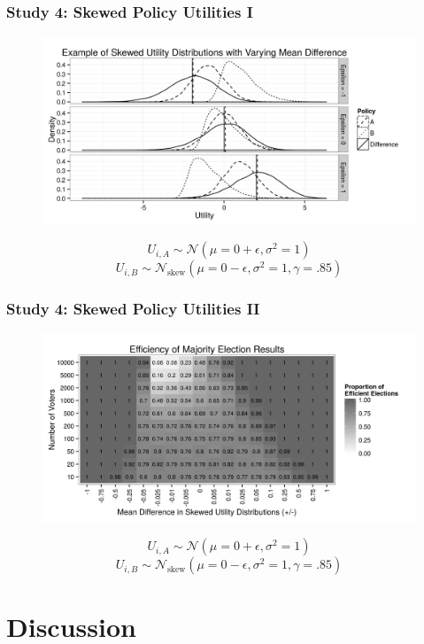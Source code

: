 \documentclass{beamer}
\begin{document}
\subsection{}
\begin{frame}%
  \frametitle{Study 4: Skewed Policy Utilities I}
  \begin{figure}[ht]\centering
    \includegraphics[height=.7\textheight]{../simulations/fig/s4a.png}
  \end{figure}
  	$$ U_{i,A} \sim \mathcal{N}(\mu=0+\epsilon,\sigma^2=1) $$
	$$ U_{i,B} \sim \mathcal{N}_\text{skew}(\mu=0-\epsilon,\sigma^2=1,\gamma=.85) $$
\end{frame}
\begin{frame}%
  \frametitle{Study 4: Skewed Policy Utilities II}
  \begin{figure}[ht]\centering
    \includegraphics[height=.7\textheight]{../simulations/fig/s4b.png}
  \end{figure}
  	$$ U_{i,A} \sim \mathcal{N}(\mu=0+\epsilon,\sigma^2=1) $$
	$$ U_{i,B} \sim \mathcal{N}_\text{skew}(\mu=0-\epsilon,\sigma^2=1,\gamma=.85) $$
\end{frame}

\section{Discussion}
\end{document}
